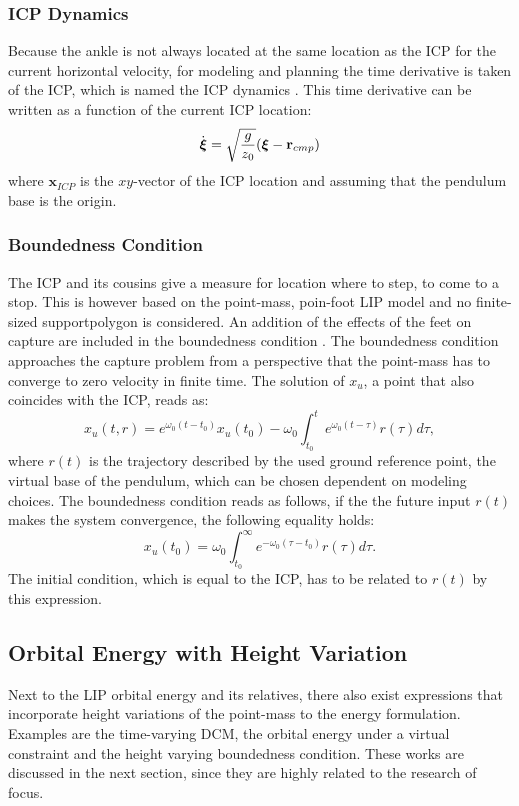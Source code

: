 \subsubsection{\ac{ICP} Dynamics}
Because the ankle is not always located at the same location as the \ac{ICP} for the current horizontal velocity, for modeling and planning the time derivative is taken of the \ac{ICP}, which is named the \ac{ICP} dynamics \cite{koolen2012capturability}. This time derivative can be written as a function of the current \ac{ICP} location:
\begin{equation}\label{eq:icpdyn}
\dot{\boldsymbol{\xi}}=\sqrt{ \frac{g}{z_0}}(\boldsymbol{\xi}-\mathbf{r}_{cmp})
\end{equation}
where $\boldsymbol{x}_{ICP}$ is the $xy$-vector of the \ac{ICP} location and assuming that the pendulum base is the origin.

\subsubsection{Boundedness Condition}
The \ac{ICP} and its cousins give a measure for location where to step, to come to a stop. This is however based on the point-mass, poin-foot \ac{LIP} model and no finite-sized supportpolygon is considered. An addition of the effects of the feet on capture  are included in the boundedness condition \cite{lanari2014boundedness}. The boundedness condition approaches the capture problem from a perspective that the point-mass has to converge to zero velocity in finite time. The solution of $x_u$, a point that also coincides with the \ac{ICP}, reads as:
\begin{equation}
x_u(t,r) = e^{\omega_0(t-t_0)}x_u(t_0) -\omega_0 \int_{t_0}^t e^{\omega_0(t-\tau)}r(\tau)d \tau,
\end{equation}
where $r(t)$ is the trajectory described by the used ground reference point, the virtual base of the pendulum, which can be chosen dependent on modeling choices. The boundedness condition reads as follows, if the the future input $r(t)$ makes the system convergence, the following equality holds:
\begin{equation}
x_u(t_0) = \omega_0 \int_{t_0}^{\infty} e^{-\omega_0(\tau-t_0)}r(\tau)d \tau.
\end{equation}
The initial condition, which is equal to the \ac{ICP}, has to be related to $r(t)$ by this expression.

\subsection{Orbital Energy with Height Variation}\label{subsec:nonorbit}
Next to the \ac{LIP} orbital energy and its relatives, there also exist expressions that incorporate height variations of the point-mass to the energy formulation. Examples are the time-varying \ac{DCM}, the orbital energy under a virtual constraint and the height varying boundedness condition. These works are discussed in the next section, since they are highly related to the research of focus.

